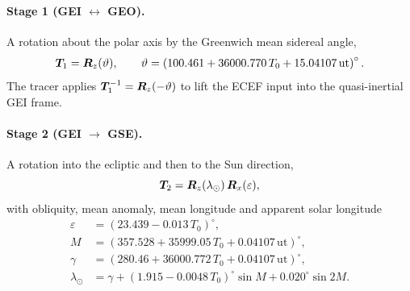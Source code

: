 \paragraph{Stage 1 (GEI $\leftrightarrow$ GEO).}  A rotation about the polar
axis by the Greenwich mean sidereal angle,
%
\begin{equation}
  \label{eq:iono-t1}
  \bm{T}_1 = \bm{R}_z(\vartheta),
  \qquad
  \vartheta = \left(100.461 + 36000.770\,T_0 + 15.04107\,\mathrm{ut}\right)^{\circ} .
\end{equation}
%
The tracer applies $\bm{T}_1^{-1} = \bm{R}_z(-\vartheta)$ to lift the ECEF
input into the quasi-inertial GEI frame.

\paragraph{Stage 2 (GEI $\to$ GSE).}  A rotation into the ecliptic and then to
the Sun direction,
%
\begin{equation}
  \label{eq:iono-t2}
  \bm{T}_2 = \bm{R}_z(\lambda_\odot)\,\bm{R}_x(\varepsilon),
\end{equation}
%
with obliquity, mean anomaly, mean longitude and apparent solar longitude
%
\begin{align}
  \varepsilon    &= \left(23.439 - 0.013\,T_0\right)^{\circ}, \\
  M              &= \left(357.528 + 35999.05\,T_0 + 0.04107\,\mathrm{ut}\right)^{\circ}, \\
  \gamma         &= \left(280.46 + 36000.772\,T_0 + 0.04107\,\mathrm{ut}\right)^{\circ}, \\
  \lambda_\odot  &= \gamma + \left(1.915 - 0.0048\,T_0\right)^{\circ}\sin M
                    + 0.020^{\circ}\sin 2M .
\end{align}

